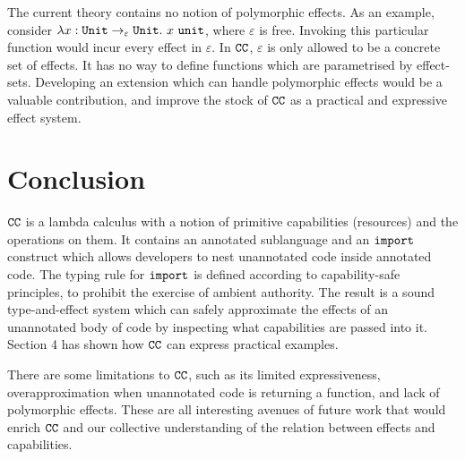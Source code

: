 The current theory contains no notion of polymorphic effects. As an example, consider $\lambda x: \mathtt{Unit} \rightarrow_{\varepsilon} \mathtt{Unit} . ~x~\mathtt{unit}$, where $\varepsilon$ is free. Invoking this particular function would incur every effect in $\varepsilon$. In $\mathtt{CC}$, $\varepsilon$ is only allowed to be a concrete set of effects. It has no way to define functions which are parametrised by effect-sets. Developing an extension which can handle polymorphic effects would be a valuable contribution, and improve the stock of $\mathtt{CC}$ as a practical and expressive effect system.

\section{Conclusion}

$\mathtt{CC}$ is a lambda calculus with a notion of primitive capabilities (resources) and the operations on them. It contains an annotated sublanguage and an $\mathtt{import}$ construct which allows developers to nest unannotated code inside annotated code. The typing rule for $\mathtt{import}$ is defined according to capability-safe principles, to prohibit the exercise of ambient authority. The result is a sound type-and-effect system which can safely approximate the effects of an unannotated body of code by inspecting what capabilities are passed into it. Section 4 has shown how $\mathtt{CC}$ can express practical examples.

There are some limitations to $\mathtt{CC}$, such as its limited expressiveness, overapproximation when unannotated code is returning a function, and lack of polymorphic effects. These are all interesting avenues of future work that would enrich $\mathtt{CC}$ and our collective understanding of the relation between effects and capabilities.






